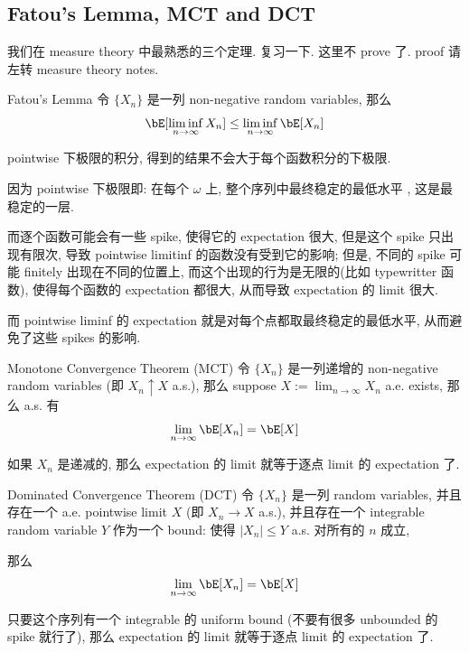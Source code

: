 \subsection{Fatou's Lemma, MCT and DCT}
我们在 measure theory 中最熟悉的三个定理. 复习一下.
这里不 prove 了. proof 请左转 measure theory notes.
\begin{theorem}{Fatou's Lemma}
令 \(\{X_n\}\) 是一列 non-negative random variables, 那么
$$ 
\bE[\liminf_{n\to\infty} X_n] \le
\liminf_{n\to\infty} \bE[ X_n] 
 $$
\end{theorem}
\begin{remark}
pointwise 下极限的积分, 
得到的结果不会大于每个函数积分的下极限.

因为 pointwise 下极限即:
 在每个 $\omega$ 上, 
 整个序列中最终稳定的最低水平
 , 这是最稳定的一层.

 而逐个函数可能会有一些 spike, 使得它的 expectation 很大,
 但是这个 spike 只出现有限次, 导致 pointwise limitinf
 的函数没有受到它的影响; 
 但是, 不同的 spike 可能 finitely 出现在不同的位置上, 
 而这个出现的行为是无限的(比如 typewritter 函数), 
 使得每个函数的 expectation 都很大, 
 从而导致 expectation 的 limit 很大.

 而 pointwise liminf 的 expectation 
 就是对每个点都取最终稳定的最低水平, 从而避免了这些 spikes 的影响.
\end{remark}

\begin{theorem}{Monotone Convergence Theorem (MCT)}
令 \(\{X_n\}\) 是一列递增的 non-negative random variables
(即 \(X_n \uparrow X\) a.s.), 那么
suppose $X:=\lim_{n\to\infty} X_n$ a.e. exists, 那么 a.s. 有
$$ 
\lim_{n\to\infty} \bE[X_n] = \bE[X]
 $$
\end{theorem}
\begin{remark}
如果 $X_n$ 是递减的, 那么 expectation 
的 limit 就等于逐点 limit 的 expectation 了.
\end{remark}


\begin{theorem}{Dominated Convergence Theorem (DCT)}
令 \(\{X_n\}\) 是一列 random variables, 
并且存在一个 a.e. pointwise limit \(X\) 
(即 \(X_n \to X\) a.s.), 
并且存在一个 integrable random variable 
\(Y\) 作为一个 bound: 使得 \(|X_n| \le Y\) a.s. 
对所有的 \(n\) 成立, 

那么
$$ 
\lim_{n\to\infty} \bE[X_n] = \bE[X]
 $$
\end{theorem}
\begin{remark}
只要这个序列有一个 integrable 的
uniform bound (不要有很多 unbounded 的 spike 就行了), 
那么 expectation 的 limit 就等于逐点 limit 的 expectation 了.
\end{remark}

